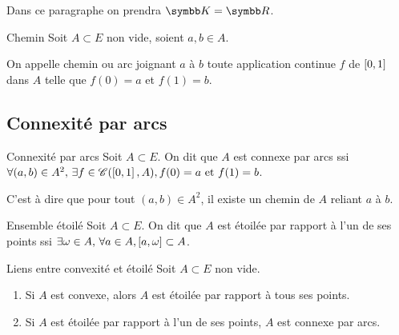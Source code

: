 Dans ce paragraphe on prendra $\K = \R$.

\begin{definition}{Chemin}{}
    Soit $A \subset E$ non vide, soient $a, b \in A$. 

    On appelle chemin ou arc joignant $a$ à $b$ toute application continue $f$ de 
    $\left[0, 1\right]$ dans $A$ telle que $f(0) = a$ et $f(1) = b$.
\end{definition}

\subsection{Connexité par arcs}

\begin{definition}{Connexité par arcs}{}
    Soit $A \subset E$. 
    On dit que $A$ est connexe par arcs ssi $\forall (a, b) \in A^2, \, \exists f \in \mathscr C(\left[0, 1\right], A), f(0) = a \text{ et } f(1) = b$. 

    C'est à dire que pour tout $(a, b) \in A^2$, il existe un chemin de $A$ reliant $a$ à $b$.
\end{definition}

\begin{definition}{Ensemble étoilé}{}
    Soit $A \subset E$.
    On dit que $A$ est étoilée par rapport à l'un de ses points ssi $\exists \omega \in A, 
    \, \forall a \in A, \left[a, \omega\right] \subset A$.
\end{definition}

\begin{proposition}{Liens entre convexité et étoilé}{}
    Soit $A \subset E$ non vide. 
    \begin{enumerate}
        \item Si $A$ est convexe, alors $A$ est étoilée par rapport à tous ses points. 
        \item Si $A$ est étoilée par rapport à l'un de ses points, $A$ est connexe par arcs. 
    \end{enumerate}
\end{proposition}



